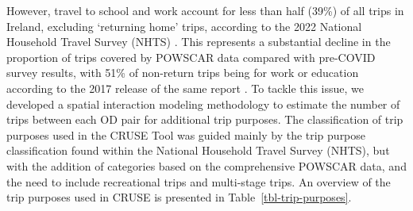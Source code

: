 \documentclass[
  super,
  preprint,
  3p]{elsarticle}
\begin{document}
However, travel to school and work account for less than half (39\%) of
all trips in Ireland, excluding `returning home' trips, according to the
2022 National Household Travel Survey (NHTS) \citep{national2022}. This
represents a substantial decline in the proportion of trips covered by
POWSCAR data compared with pre-COVID survey results, with 51\% of
non-return trips being for work or education according to the 2017
release of the same report \citep{national2017}. To tackle this issue,
we developed a spatial interaction modeling methodology to estimate the
number of trips between each OD pair for additional trip purposes. The
classification of trip purposes used in the CRUSE Tool was guided mainly
by the trip purpose classification found within the National Household
Travel Survey (NHTS), but with the addition of categories based on the
comprehensive POWSCAR data, and the need to include recreational trips
and multi-stage trips. An overview of the trip purposes used in CRUSE is
presented in Table~\ref{tbl-trip-purposes}.

\begingroup\fontsize{8}{10}\selectfont
\end{document}
